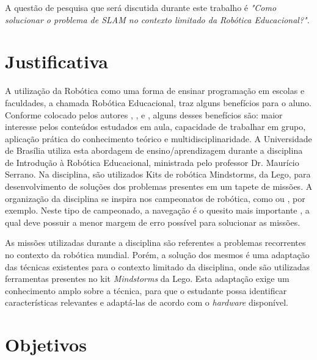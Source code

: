 	A questão de pesquisa que será discutida durante este trabalho é \textit{"Como solucionar o problema de SLAM no contexto limitado da Robótica Educacional?"}.

\section{Justificativa}

	A utilização da Robótica como uma forma de ensinar programação em escolas e faculdades, a chamada Robótica Educacional, traz alguns benefícios para o aluno. Conforme colocado pelos autores \cite{teachingWithRoboticKit}, \cite{roboticEducationBasedLego}, \cite{roboticaEducacionalAulasMatematica} e \cite{evaluationRoboticEducationScale}, alguns desses benefícios são: maior interesse pelos conteúdos estudados em aula, capacidade de trabalhar em grupo, aplicação prática do conhecimento teórico e multidisciplinaridade. A Universidade de Brasília utiliza esta abordagem de ensino/aprendizagem durante a disciplina de Introdução à Robótica Educacional, ministrada pelo professor Dr. Maurício Serrano. Na disciplina, são utilizados Kits de robótica Mindstorms, da Lego, para desenvolvimento de soluções dos problemas presentes em um tapete de missões. A organização da disciplina se inspira nos campeonatos de robótica, como \cite{ciber-rato} ou \cite{roboBulldozerIV}, por exemplo. Neste tipo de campeonado, a navegação é o quesito mais importante \cite{ciber-rato}, a qual deve possuir a menor margem de erro possível para solucionar as missões.

	As missões utilizadas durante a disciplina são referentes a problemas recorrentes no contexto da robótica mundial. Porém, a solução dos mesmos é uma adaptação das técnicas existentes para o contexto limitado da disciplina, onde são utilizadas ferramentas presentes no kit \textit{Mindstorms} da Lego. Esta adaptação exige um conhecimento amplo sobre a técnica, para que o estudante possa identificar características relevantes e adaptá-las de acordo com o \textit{hardware} disponível.


	\section{Objetivos}

